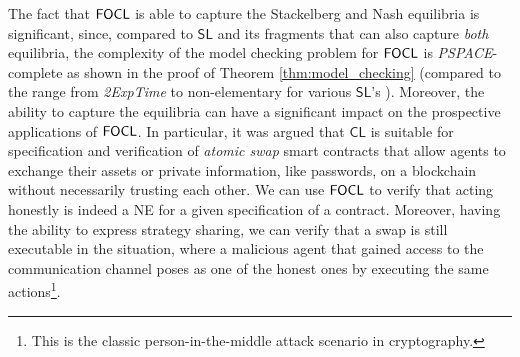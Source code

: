 \documentclass{article}
\newcommand\rustam[1]{\todo[color=blue!30,size=\small,inline]{Rustam: #1}}
\begin{document}
The fact that $\mathsf{FOCL}$ is able to capture the Stackelberg and Nash equilibria is significant, since, compared to $\mathsf{SL}$ and its fragments that can also capture \textit{both} equilibria, the complexity of the model checking problem for $\mathsf{FOCL}$ is \textit{PSPACE}-complete as shown in the proof of Theorem \ref{thm:model_checking} (compared to the range from \textit{2ExpTime} to non-elementary for various $\mathsf{SL}$'s \cite{mogavero14}). Moreover, the ability to capture the equilibria can have a significant impact on the prospective applications of $\mathsf{FOCL}$. In particular, it was argued \cite{vandermeyden19,galimullin22} that $\mathsf{CL}$ is suitable for specification and verification of \textit{atomic swap} %
smart contracts that allow agents to exchange their assets or private information, like passwords, on a blockchain without necessarily trusting each other. We can use $\mathsf{FOCL}$ to verify that acting honestly is indeed a NE for a given specification of a contract. Moreover, having the ability to express strategy sharing, we can verify that a swap is still executable in the situation, where a malicious agent that gained access to the communication channel poses as one of the honest ones by executing the same actions\footnote{This is the classic person-in-the-middle attack scenario in cryptography.}. 
\end{document}
